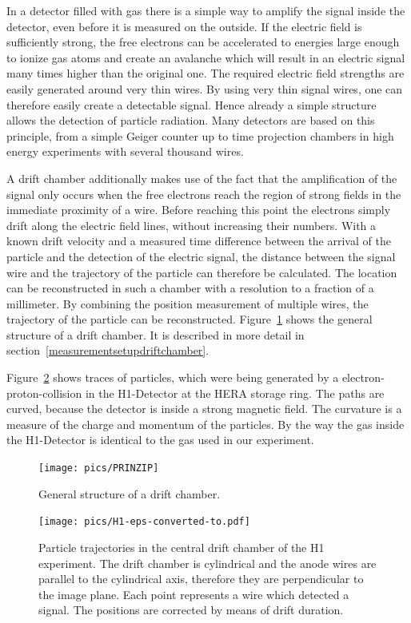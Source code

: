 \documentclass[12pt]{article}
\begin{document}
In a detector filled with gas there is a simple way to amplify the signal inside the detector, even before it is measured on the outside. If the electric field is sufficiently strong, the free electrons can be accelerated to energies large enough to ionize gas atoms and create an avalanche which will result in an electric signal many times higher than the original one. The required electric field strengths are easily generated around very thin wires. By using very thin signal wires, one can therefore easily create a detectable signal. Hence already a simple structure allows the detection of particle radiation. Many detectors are based on this principle, from a simple Geiger counter up to time projection chambers in high energy experiments with several thousand wires. 

A drift chamber additionally makes use of the fact that the amplification of the signal only occurs when the free electrons reach the region of strong fields in the immediate proximity of a wire. Before reaching this point the electrons simply drift along the electric field lines, without increasing their numbers. With a known drift velocity and a measured time difference between the arrival of the particle and the detection of the electric signal, the distance between the signal wire and the trajectory of the particle can therefore be calculated. The location can be reconstructed in such a chamber with a resolution to a fraction of a millimeter. By combining the position measurement of multiple wires, the trajectory of the particle can be reconstructed. Figure~\ref{fig:structure} shows the general structure of a drift chamber. It is described in more detail in section~\ref{measurementsetupdriftchamber}.


Figure~\ref{fig:H1_detector} shows traces of particles, which were being generated by a electron-proton-collision in the H1-Detector at the HERA storage ring. The paths are curved, because the detector is inside a strong magnetic field. The curvature is a measure of the charge and momentum of the particles. By the way the gas inside the H1-Detector is identical to the gas used in our experiment. 

\begin{figure}[h]
\texttt{[image: pics/PRINZIP]}
\centering
\caption{General structure of a drift chamber.}
\label{fig:structure}
\end{figure}

\newpage

\begin{figure}[!h]
\texttt{[image: pics/H1-eps-converted-to.pdf]}
\centering
\caption{Particle trajectories in the central drift chamber of the H1 experiment. The drift chamber is cylindrical and the anode wires are parallel to the cylindrical axis, therefore they are perpendicular to the image plane. Each point represents a wire which detected a signal. The positions are corrected by means of drift duration.}
\label{fig:H1_detector}
\end{figure}
\end{document}
